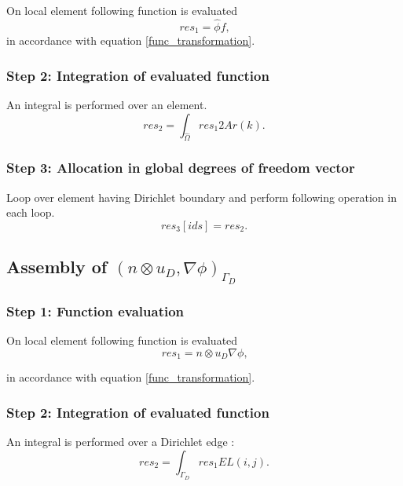 \documentclass[a4paper,twoside,openright]{book}
\begin{document}
On local element following function is evaluated 
\begin{equation}
res_1 = \hat{\phi} f \textrm{,}
\end{equation} 
in accordance with equation \eqref{func_transformation}.\\

\subsubsection{Step 2: Integration of evaluated function}
An integral is performed over an element.
\begin{equation}
res_2 = \int_{\hat{\Omega}} res_1 2 Ar(k) \textrm{.}
\end{equation}

\subsubsection{Step 3: Allocation in global degrees of freedom vector}

Loop over element having Dirichlet boundary and perform following operation in each loop.
\begin{equation}
res_3[ids]=res_2 \textrm{.}
\end{equation}

\subsection{Assembly of $(n \otimes u_D,\nabla \phi)_{\Gamma_D} $}

\subsubsection{Step 1: Function evaluation}

On local element following function is evaluated
\begin{equation}
res_1 =  n \otimes u_D  \nabla \phi \textrm{,}
\end{equation}

in accordance with equation \eqref{func_transformation}.\\

\subsubsection{Step 2: Integration of evaluated function}

An integral is performed over a Dirichlet edge :
\begin{equation}
res_2 = \int_{\Gamma_D} res_1 EL(i,j) \textrm{.}
\end{equation}
\end{document}
